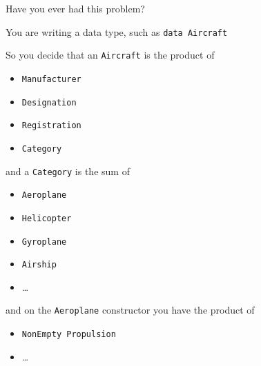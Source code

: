 \begin{frame}
\begin{center}
Have you ever had this problem?
\end{center}
\end{frame}

\begin{frame}
\begin{center}
You are writing a data type, such as \lstinline{data Aircraft}
\end{center}
\end{frame}

\begin{frame}
\begin{center}
So you decide that an \lstinline{Aircraft} is the product of
\end{center}
\begin{itemize}
\item \lstinline{Manufacturer}
\item \lstinline{Designation}
\item \lstinline{Registration}
\item \lstinline{Category}
\end{itemize}
\end{frame}

\begin{frame}
\begin{center}
and a \lstinline{Category} is the sum of
\end{center}
\begin{itemize}
\item \lstinline{Aeroplane}
\item \lstinline{Helicopter}
\item \lstinline{Gyroplane}
\item \lstinline{Airship}
\item \ldots
\end{itemize}
\end{frame}

\begin{frame}
\begin{center}
and on the \lstinline{Aeroplane} constructor you have the product of
\end{center}
\begin{itemize}
\item \lstinline{NonEmpty Propulsion}
\item \ldots
\end{itemize}
\end{frame}

